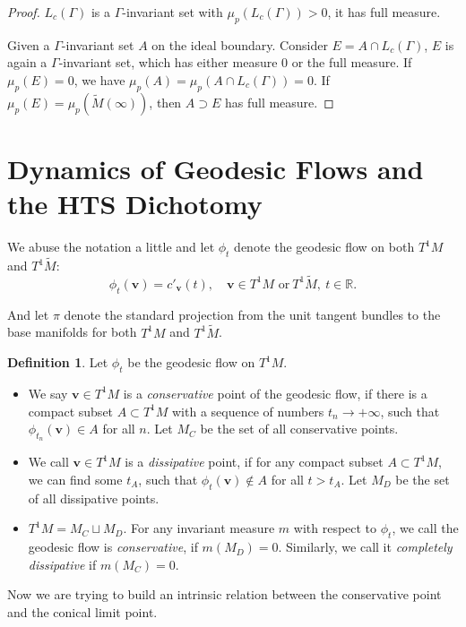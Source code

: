 \documentclass[reqno,11pt]{article}
\theoremstyle{definition}
\newtheorem{definition}[theorem]{Definition}
\theoremstyle{remark}
\numberwithin{equation}{section}
\begin{document}
\begin{proof}
	$L_c(\Gamma)$ is a $\Gamma$-invariant set with $\mu_p(L_c(\Gamma))>0$, it has full measure.

	Given a $\Gamma$-invariant set $A$ on the ideal boundary. Consider $E=A\cap L_c(\Gamma)$, $E$ is again a $\Gamma$-invariant set, which has either measure $0$ or the full measure. If $\mu_p(E)=0$, we have $\mu_p(A)=\mu_p(A\cap L_c(\Gamma))=0$. If $\mu_p(E)=\mu_p(\widetilde{M}(\infty))$, then $A\supset E$ has full measure.
\end{proof}

\section{\bf Dynamics of Geodesic Flows and the HTS Dichotomy}\label{sec6}
We abuse the notation a little and let $\phi_t$ denote the geodesic flow on both $T^1 M$ and $T^1\widetilde{M}$:
\begin{displaymath}
	\phi_t(\bm{v})=c'_{\bm{v}}(t),\quad \bm{v}\in T^1M\text{~or}~T^1\widetilde{M},~t\in\mathbb{R}.
\end{displaymath}

And let $\pi$ denote the standard projection from the unit tangent bundles to the base manifolds for both $T^1M$ and $T^1\widetilde{M}$.
\begin{definition}
	Let $\phi_t$ be the geodesic flow on $T^1M$.
	\begin{itemize}
		\item We say $\bm{v}\in T^1M$ is a \emph{conservative} point of the geodesic flow, if there is a compact subset $A\subset T^1M$ with a sequence of numbers $t_n\to+\infty$, such that $\phi_{t_n}(\bm{v})\in A$ for all $n$. Let $M_C$ be the set of all conservative points.
		\item We call $\bm{v}\in T^1M$ is a \emph{dissipative} point, if for any compact subset $A\subset T^1M$, we can find some $t_A$, such that $\phi_t(\bm{v})\notin A$ for all $t>t_A$. Let $M_D$ be the set of all dissipative points.
		\item $T^1M=M_C\sqcup M_D$. For any invariant measure $m$ with respect to $\phi_t$, we call the geodesic flow is \emph{conservative}, if $m(M_D)=0$. Similarly, we call it \emph{completely dissipative} if $m(M_C)=0$.
	\end{itemize}
\end{definition}

Now we are trying to build an intrinsic relation between the conservative point and the conical limit point.
\end{document}
